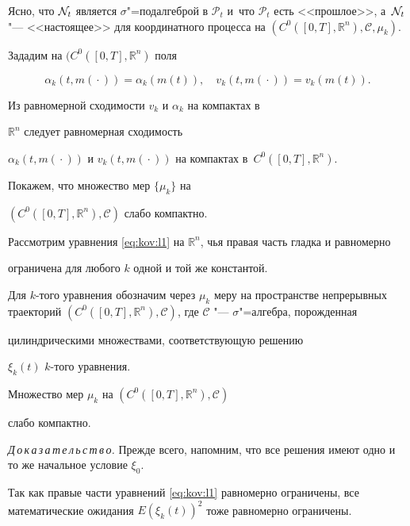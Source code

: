 Ясно, что ${\cal N}_t$ является $\sigma$"=подалгеброй в $\mathcal{P}_t$ и~что $\mathcal{P}_t$  есть <<прош\-лое>>, а~${\cal N}_t$ "--- <<настоящее>> для координатного процесса на $(C^0([0, T],\mathbb{R}^n),\mathcal{C},\mu_k)$.



Зададим на $(C^0([0,T],\mathbb{R}^n)$ поля

$$\alpha_k(t,m({}\cdot{}))=\alpha_k(m(t)),\quad v_k(t,m({}\cdot{}))=v_k(m(t)).$$

Из равномерной сходимости $v_k$ и $\alpha_k$ на компактах в

$\mathbb{R}^n$ следует равномерная сходимость

$\alpha_k(t,m({}\cdot{}))$ и $v_k(t,m({}\cdot{}))$ на компактах в~$C^0([0,T],\mathbb{R}^n)$.



Покажем, что множество мер $\{\mu_k\}$ на

$(C^0([0,T],\mathbb{R}^n),\mathcal{C})$ слабо компактно.



Рассмотрим уравнения \eqref{eq:kov:l1} на $\mathbb{R}^n$, чья правая часть гладка и равномерно

ограничена для любого $k$ одной и той же константой. 

Для $k$-того уравнения обозначим через $\mu_k$ меру на пространстве непрерывных траекторий $(C^0([0,T],\mathbb{R}^n),\mathcal{C})$, где $\mathcal{C}$ "--- $\sigma$"=алгебра, порожденная

              цилиндрическими множествами, соответствующую решению

              $\xi_k(t)$ $k$-того уравнения.

              

\smallskip

\begin{lemma}

              Множество мер $\mu_k$ на $(C^0([0,T],\mathbb{R}^n),\mathcal{C})$

              слабо компактно$.$

\end{lemma}



\smallskip



{\it Д\,о\,к\,а\,з\,а\,т\,е\,л\,ь\,с\,т\,в\,о.\/} Прежде всего, напомним, что все решения имеют одно и то же начальное условие $\xi_0$. 

Так как правые части уравнений \eqref{eq:kov:l1} равномерно ограничены, все математические ожидания $E(\xi_k(t))^2$ тоже равномерно ограничены.



